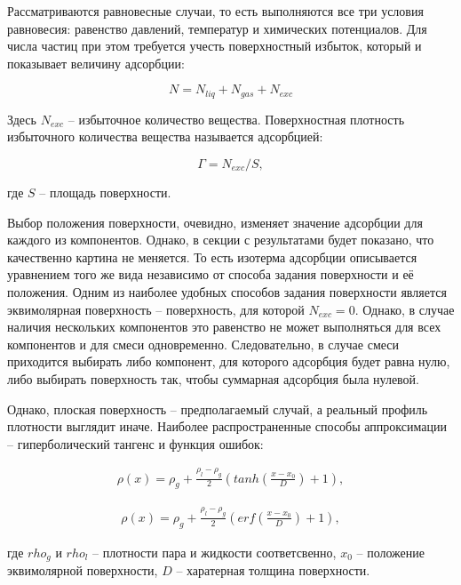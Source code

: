 Рассматриваются равновесные случаи, то есть выполняются все три условия равновесия: равенство давлений, температур и химических потенциалов. Для числа частиц при этом требуется учесть поверхностный избыток, который и показывает величину адсорбции:

\begin{equation}
    N = N_{liq} + N_{gas} + N_{exc}
\end{equation}

Здесь $N_{exc}$ \--- избыточное количество вещества. Поверхностная плотность избыточного количества вещества называется адсорбцией:

\begin{equation}
    \Gamma = N_{exc} / S,
\end{equation}

где $S$ \--- площадь поверхности.  

Выбор положения поверхности, очевидно, изменяет значение адсорбции для каждого из компонентов. Однако, в секции с результатами будет показано, что качественно картина не меняется. То есть изотерма адсорбции описывается уравнением того же вида независимо от способа задания поверхности и её положения. Одним из наиболее удобных способов задания поверхности является эквимолярная поверхность \--- поверхность, для которой $N_{exc} = 0$. Однако, в случае наличия нескольких компонентов это равенство не может выполняться для всех компонентов и для смеси одновременно. Следовательно, в случае смеси приходится выбирать либо компонент, для которого адсорбция будет равна нулю, либо выбирать поверхность так, чтобы суммарная адсорбция была нулевой.

Однако, плоская поверхность \--- предполагаемый случай, а реальный профиль плотности выглядит иначе. Наиболее распространенные способы аппроксимации \--- гиперболический тангенс и функция ошибок:

\begin{align}
\rho(x) = \rho_g + \frac{\rho_l-\rho_g}{2}(tanh(\frac{x-x_0}{D})+1),
\end{align}

\begin{align}
\rho(x) = \rho_g + \frac{\rho_l-\rho_g}{2}(erf(\frac{x-x_0}{D})+1),
\end{align}

где $rho_g$ и $rho_l$ \--- плотности пара и жидкости соответсвенно, $x_0$ \--- положение эквимолярной поверхности, $D$ \--- харатерная толщина поверхности.


